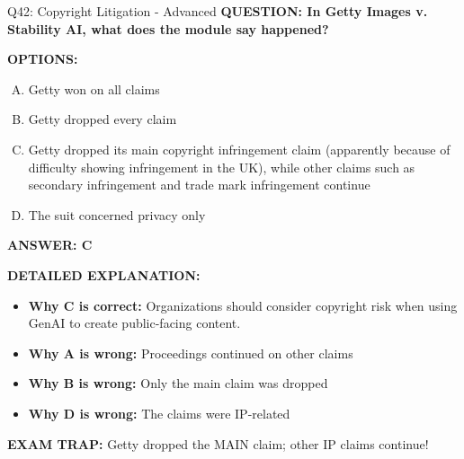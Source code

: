 \documentclass[8pt]{beamer}
\begin{document}
\begin{frame}[shrink=6]{Q42: Copyright Litigation - Advanced}
\fontsize{6.5}{7.5}\selectfont
\textbf{QUESTION: In Getty Images v. Stability AI, what does the module say happened?}

\vspace{0.1cm}
\textbf{OPTIONS:}
\begin{enumerate}[A.]
\item Getty won on all claims
\item Getty dropped every claim
\item Getty dropped its main copyright infringement claim (apparently because of difficulty showing infringement in the UK), while other claims such as secondary infringement and trade mark infringement continue
\item The suit concerned privacy only
\end{enumerate}

\vspace{0.1cm}
\textcolor{myblue}{\textbf{ANSWER: C}}

\vspace{0.1cm}
\textbf{DETAILED EXPLANATION:}
\begin{itemize}
\item \textbf{Why C is correct:} Organizations should consider copyright risk when using GenAI to create public-facing content.
\item \textbf{Why A is wrong:} Proceedings continued on other claims
\item \textbf{Why B is wrong:} Only the main claim was dropped
\item \textbf{Why D is wrong:} The claims were IP-related
\end{itemize}

\textcolor{myred}{\textbf{EXAM TRAP:}} Getty dropped the MAIN claim; other IP claims continue!
\end{frame}
\end{document}
